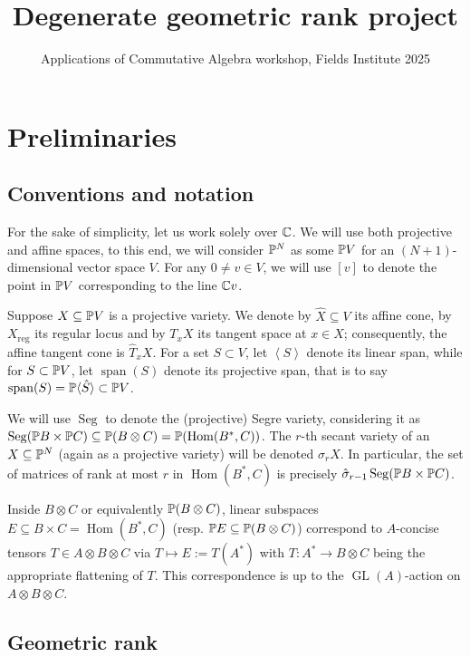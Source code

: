 \documentclass[a4paper,10pt]{article}
\title{Degenerate geometric rank project}
\author{Applications of Commutative Algebra workshop, Fields Institute 2025}
\date{}
\def\reg{\text{reg}}
\def\gener#1{\left\langle#1\right\rangle}
\DeclareMathOperator{\Hom}{Hom}\let\hom\Hom
\DeclareMathOperator{\Seg}{Seg}
\DeclareMathOperator{\GL}{GL}
\DeclareMathOperator{\spn}{span}
\def\uv#1{``#1''}
\theoremstyle{definition}
\theoremstyle{remark}
\begin{document}
\maketitle

\setcounter{section}{-1}
\section{Preliminaries}

\subsection{Conventions and notation}
For the sake of simplicity, let us work solely over $\ce$.
We will use both projective and affine spaces, to this end, we will consider $\pe^N$ as some $\pe V$ for an $(N+1)$-dimensional vector space $V$. For any $0\neq v\in V$, we will use $[v]$ to denote the point in $\pe V$ corresponding to the line $\ce v$.

Suppose $X\subseteq\pe V$ is a projective variety. We denote by $\hat X\subseteq V$ its affine cone, by $X_\reg$ its regular locus and by $T_xX$ its tangent space at $x\in X$; consequently, the affine tangent cone is $\hat T_x X$. For a set $S\subset V$, let $\gener S$ denote its linear span, while for $S\subset \pe V$, let $\spn(S)$ denote its projective span, that is to say $\spn(S)=\pe \langle\hat S\rangle\subset \pe V$.

We will use $\Seg$ to denote the (projective) Segre variety, considering it as $\Seg(\pe B\times\pe C)\subseteq  \pe(B\otimes C)= \pe(\Hom(B^*, C))$. The $r$-th secant variety of an $X\subseteq\pe^N$ (again as a projective variety) will be denoted $\sigma_r X$. In particular, the set of matrices of rank at most $r$ in $\Hom(B^*,C)$ is precisely $\hat\sigma_{r-1}\Seg(\pe B\times\pe C)$.

Inside $B\otimes C$ or equivalently $\pe(B\otimes C)$, linear subspaces $E\subseteq B\times C = \Hom(B^*, C)$ (resp. $\pe E\subseteq \pe(B\otimes C)$) correspond to $A$-concise tensors $T\in A\otimes B\otimes C$ via $T\mapsto E:=T(A^*)$ with $T:A^*\to B\otimes C$ being the appropriate flattening of $T$. This correspondence is up to the $\GL(A)$-action on $A\otimes B\otimes C$.

\subsection{Geometric rank}

\end{document}
